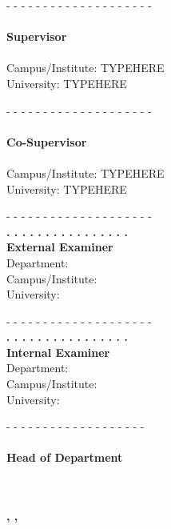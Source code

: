 \begin{minipage}{0.55\textwidth}
	
- - - - - - - - - - - - - - - - - - - - \\
\textbf{\sup\\
Supervisor}\\
\depart\\
Campus/Institute: TYPEHERE \\
University: TYPEHERE

\vspace{0.8cm}

- - - - - - - - - - - - - - - - - - - - \\
\textbf{\cosup\\
Co-Supervisor}\\
\depart\\
Campus/Institute: TYPEHERE \\
University: TYPEHERE


\end{minipage}
\begin{minipage}{0.5\textwidth}

- - - - - - - - - - - - - - - - - - - - \\
\textbf{. . . . . . . . . . . . . . . . \\
External Examiner}\\
Department: \\
Campus/Institute: \\
University: 

\vspace{0.8cm}

- - - - - - - - - - - - - - - - - - - - \\
\textbf{. . . . . . . . . . . . . . . . \\
Internal Examiner}\\
Department: \\
Campus/Institute: \\
University: 

\end{minipage}

\vspace{1.6cm}

\setlength{\leftskip}{5.4cm}
- - - - - - - - - - - - - - - - - - - \\
\textbf{\hod\\
Head of Department}\\
\depart\\
\clz\\
\tu

\setlength{\leftskip}{0pt}

\begin{center}\textbf{\the\day, \uppermonth, \the\year}\end{center}

\pagebreak

